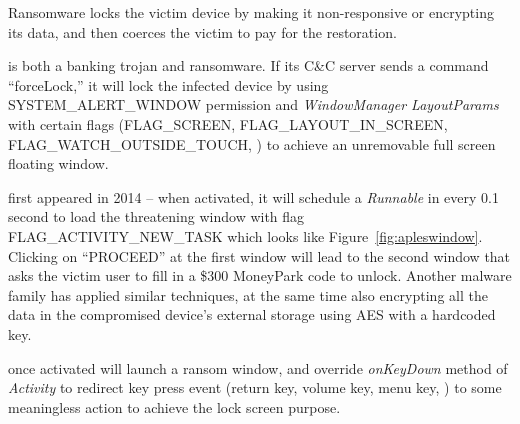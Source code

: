 Ransomware %
locks the victim device by making it
non-responsive or encrypting its data, and
then coerces the victim to pay for the restoration.




 is both a banking trojan and ransomware.
If its C\&C server sends a command ``forceLock,''
it will lock the infected device by using SYSTEM_ALERT_WINDOW
permission and {\em WindowManager LayoutParams} 
with certain flags (\eg FLAG_SCREEN, FLAG_LAYOUT_IN_SCREEN,
FLAG_WATCH_OUTSIDE_TOUCH, \etc)
to achieve an unremovable full screen floating window.

 first appeared in 2014 -- when activated, it will
schedule a {\em Runnable} in every 0.1 second
to load the threatening window
with flag FLAG_ACTIVITY_NEW_TASK
which looks like Figure~\ref{fig:apleswindow}.
Clicking on ``PROCEED'' at the first window
will lead to the second window that asks the victim user to fill in a 
\$300 MoneyPark code to unlock.
Another malware family  has applied similar techniques,
at the same time also encrypting all the data in the compromised device's external
storage using AES with a hardcoded key.

 once activated will launch a ransom window, and override {\em onKeyDown}
method of {\em Activity} to redirect key press event (\eg return key, volume key, menu key, \etc)
to some meaningless action to achieve the lock screen purpose.

